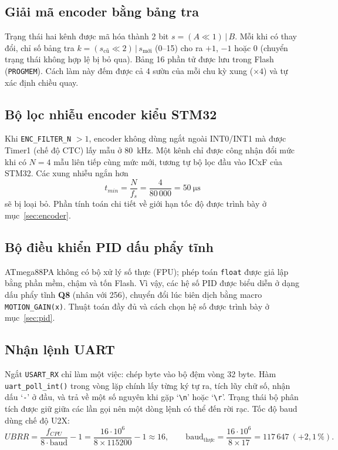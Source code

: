 \subsection{Giải mã encoder bằng bảng tra}
Trạng thái hai kênh được mã hóa thành 2 bit $s=(A\ll1)\,|\,B$. Mỗi khi có thay đổi, chỉ số bảng tra $k=(s_{\text{cũ}}\ll2)\,|\,s_{\text{mới}}$ (0--15) cho ra $+1$, $-1$ hoặc $0$ (chuyển trạng thái không hợp lệ bị bỏ qua). Bảng 16 phần tử được lưu trong Flash (\texttt{PROGMEM}). Cách làm này đếm được cả 4 sườn của mỗi chu kỳ xung ($\times4$) và tự xác định chiều quay.

\subsection{Bộ lọc nhiễu encoder kiểu STM32}
Khi \texttt{ENC\_FILTER\_N} $>1$, encoder không dùng ngắt ngoài INT0/INT1 mà được Timer1 (chế độ CTC) lấy mẫu ở \SI{80}{\kilo\hertz}. Một kênh chỉ được công nhận đổi mức khi có $N=4$ mẫu liên tiếp cùng mức mới, tương tự bộ lọc đầu vào ICxF của STM32. Các xung nhiễu ngắn hơn
\begin{equation}
  t_{min}=\frac{N}{f_s}=\frac{4}{80\,000}=\SI{50}{\micro\second}
\end{equation}
sẽ bị loại bỏ. Phần tính toán chi tiết về giới hạn tốc độ được trình bày ở mục~\ref{sec:encoder}.

\subsection{Bộ điều khiển PID dấu phẩy tĩnh}
ATmega88PA không có bộ xử lý số thực (FPU); phép toán \texttt{float} được giả lập bằng phần mềm, chậm và tốn Flash. Vì vậy, các hệ số PID được biểu diễn ở dạng dấu phẩy tĩnh \textbf{Q8} (nhân với 256), chuyển đổi lúc biên dịch bằng macro \texttt{MOTION\_GAIN(x)}. Thuật toán đầy đủ và cách chọn hệ số được trình bày ở mục~\ref{sec:pid}.

\subsection{Nhận lệnh UART}
Ngắt \texttt{USART\_RX} chỉ làm một việc: chép byte vào bộ đệm vòng 32 byte. Hàm \texttt{uart\_poll\_int()} trong vòng lặp chính lấy từng ký tự ra, tích lũy chữ số, nhận dấu `\texttt{-}' ở đầu, và trả về một số nguyên khi gặp `\texttt{\textbackslash n}' hoặc `\texttt{\textbackslash r}'. Trạng thái bộ phân tích được giữ giữa các lần gọi nên một dòng lệnh có thể đến rời rạc. Tốc độ baud dùng chế độ U2X:
\begin{equation}
  UBRR=\frac{f_{CPU}}{8\cdot\text{baud}}-1=\frac{16\cdot10^6}{8\times115200}-1\approx16,\qquad
  \text{baud}_{\text{thực}}=\frac{16\cdot10^6}{8\times17}=117\,647\ (+2{,}1\,\%).
\end{equation}

